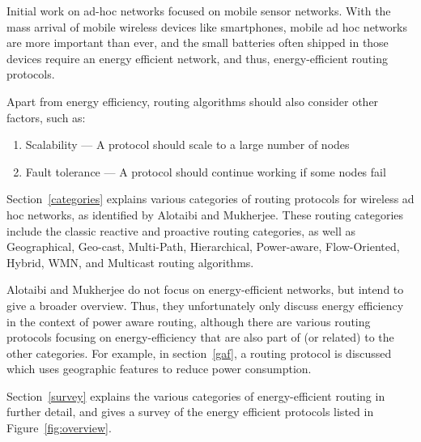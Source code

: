 Initial work on ad-hoc networks focused on mobile sensor networks. With the
mass arrival of mobile wireless devices like smartphones, mobile ad hoc networks
are more important than ever, and the small batteries often shipped in those devices
require an energy efficient network, and thus, energy-efficient routing
protocols.

Apart from energy efficiency, routing algorithms should also consider other
factors, such as:
\begin{enumerate}
   \item Scalability --- A protocol should scale to a large number of nodes
   \item Fault tolerance --- A protocol should continue working if some nodes fail
\end{enumerate}

Section~\ref{categories} explains various categories of routing protocols for
wireless ad hoc networks, as identified by Alotaibi and Mukherjee\cite{alotaibi2012survey}. These
routing categories include the classic reactive and proactive routing categories,
as well as
  Geographical, Geo-cast, Multi-Path, Hierarchical, Power-aware, Flow-Oriented,
  Hybrid, WMN, and Multicast routing algorithms. 


Alotaibi and Mukherjee\cite{alotaibi2012survey} do not focus on energy-efficient networks, but intend to give
a broader overview. Thus, they unfortunately only discuss energy efficiency in the
context of power aware routing, although there are various routing protocols
focusing on energy-efficiency that are also part of (or related) to the other categories.
For example, in section~\ref{gaf}, a routing protocol is discussed which
uses geographic features to reduce power consumption.

Section~\ref{survey} explains the various categories of energy-efficient
routing in further detail, and gives a survey of the energy efficient protocols
listed in Figure~\ref{fig:overview}.

